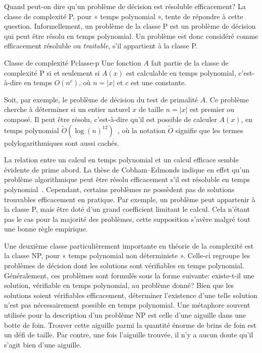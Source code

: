 Quand peut-on dire qu'un problème de décision est résoluble efficacement? La classe de complexité \textsf{P}, pour « temps polynomial », tente de répondre à cette question. Informellement, un problème de la classe \textsf{P} est un problème de décision qui peut être résolu en temps polynomial. Un problème est donc considéré comme efficacement résoluble ou \textit{traitable}, s'il appartient à la classe \textsf{P}. 

\begin{maindefinition}{Classe de complexité \textsf{P}}{classe-p}
    Une fonction $A$ fait partie de la classe de complexité \textsf{P} si et seulement si $A(x)$ est calculable en temps polynomial, c’est-à-dire en temps $O(n^{c})$, où $n = \lvert x \rvert$ et $c$ est une constante.
\end{maindefinition}

Soit, par exemple, le problème de décision du test de primalité $A$. Ce problème cherche à déterminer si un entier naturel $x$ de taille $n=\lvert x \rvert $ est premier ou composé. Il peut être résolu, c'est-à-dire qu'il est possible de calculer $A(x)$, en temps polynomial $\tilde{O}(\log(n)^{12})$~\cite{agrawalPRIMES2004}, où la notation $\tilde{O}$ signifie que les termes polylogarithmiques sont aussi cachés. 

La relation entre un calcul en temps polynomial et un calcul efficace semble évidente de prime abord. La thèse de Cobham–Edmonds indique en effet qu'un problème algorithmique peut être résolu efficacement s'il est résoluble en temps polynomial~\cite{cobhamIntrinsicComputationalDifficulty1965, edmondsPathsTreesFlowers1965}. Cependant, certains problèmes ne possèdent pas de solutions trouvables efficacement en pratique. Par exemple, un problème peut appartenir à la classe \textsf{P}, mais être doté d'un grand coefficient limitant le calcul. Cela n'étant pas le cas pour la majorité des problèmes, cette supposition s'avère malgré tout une bonne règle empirique. 

Une deuxième classe particulièrement importante en théorie de la complexité est la classe \textsf{NP}, pour « temps polynomial non déterministe ». Celle-ci regroupe les problèmes de décision dont les solutions sont vérifiables en temps polynomial. Généralement, ces problèmes sont formulés sous la forme suivante: existe-t-il une solution, vérifiable en temps polynomial, au problème donné? Bien que les solutions soient vérifiables efficacement, déterminer l'existence d'une telle solution n'est pas nécessairement possible en temps polynomial. Une métaphore souvent utilisée pour la description d'un problème \textsf{NP} est celle d'une aiguille dans une botte de foin. Trouver cette aiguille parmi la quantité énorme de brins de foin est un défi de taille. Par contre, une fois l'aiguille trouvée, il n'y a aucun doute qu'il s'agit bien d'une aiguille. 

